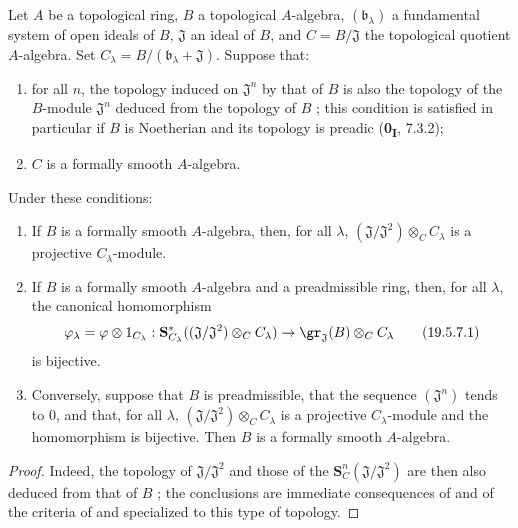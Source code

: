 \begin{corollary}[19.5.7]
\label{0.19.5.7}
Let $A$ be a topological ring, $B$ a topological $A$-algebra, $(\mathfrak{b}_\lambda)$ a fundamental system of open ideals of $B$, $\mathfrak{J}$ an ideal of $B$, and $C=B/\mathfrak{J}$ the topological quotient $A$-algebra.
Set $C_\lambda=B/(\mathfrak{b}_\lambda+\mathfrak{J})$.
Suppose that:
\begin{enumerate}
  \item[$1^\circ$] for all $n$, the topology induced on $\mathfrak{J}^n$ by that of $B$ is also the topology of the $B$-module $\mathfrak{J}^n$ deduced from the topology of $B$ ; this condition is satisfied in particular if $B$ is Noetherian and its topology is preadic (\textbf{0\textsubscript{I}}, 7.3.2);
  \item[$2^\circ$] $C$ is a formally smooth $A$-algebra.
\end{enumerate}
Under these conditions:
\begin{enumerate}
  \item[\rm(i)] If $B$ is a formally smooth $A$-algebra, then, for all $\lambda$, $(\mathfrak{J}/\mathfrak{J}^2)\otimes_C C_\lambda$ is a projective $C_\lambda$-module.
  \item[\rm(ii)] If $B$ is a formally smooth $A$-algebra and a preadmissible ring, then, for all $\lambda$, the canonical homomorphism
  \[
    \label{0.19.5.7.1}
    \varphi_\lambda=\varphi\otimes 1_{C_\lambda}:
    \mathbf{S}_{C_\lambda}^*((\mathfrak{J}/\mathfrak{J}^2)\otimes_C C_\lambda)
    \to \gr_\mathfrak{J}(B)\otimes_C C_\lambda
    \tag{19.5.7.1}
  \]
  is bijective.
  \item[\rm(iii)] Conversely, suppose that $B$ is preadmissible, that the sequence $(\mathfrak{J}^n)$ tends to $0$, and that, for all $\lambda$, $(\mathfrak{J}/\mathfrak{J}^2)\otimes_C C_\lambda$ is a projective $C_\lambda$-module and the homomorphism  is bijective.
  Then $B$ is a formally smooth $A$-algebra.
\end{enumerate}
\end{corollary}

\begin{proof}
Indeed, the topology of $\mathfrak{J}/\mathfrak{J}^2$ and those of the $\mathbf{S}_C^n(\mathfrak{J}/\mathfrak{J}^2)$ are then also deduced from that of $B$ ;
the conclusions are immediate consequences of  and of the criteria of  and  specialized to this type of topology.
\end{proof}

